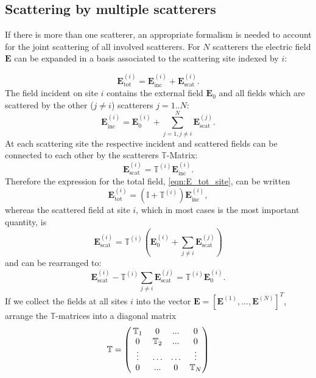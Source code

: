 \subsection{Scattering by multiple scatterers}
If there is more than one scatterer, an appropriate formalism is needed to account for the joint scattering of all involved scatterers. 
For $N$ scatterers the electric field $\mathbf{E}$ can be expanded in a basis associated to the scattering site indexed by $i$:

\begin{equation}
\mathbf{E}_\mathrm{tot}^{(i)} = \mathbf{E}_\mathrm{inc}^{(i)} + 
\mathbf{E}_\mathrm{scat}^{(i)}.
\label{eqn:E_tot_site}
\end{equation}
The field incident on site $i$ contains the external field $\mathbf{E}_0$ and all fields which are scattered by the other ($j\neq i$) scatterers $j=1..N$:
\begin{equation}
\mathbf{E}_\mathrm{inc}^{(i)} = \mathbf{E}_0^{(i)} + \sum_{j=1,j\neq i}^N\mathbf{E}_\mathrm{scat}^{(j)}.
\end{equation}
At each scattering site the respective incident and scattered fields can be connected to each other by the scatterers $\mathbb{T}$-Matrix:
\begin{equation}
\mathbf{E}_\mathrm{scat}^{(i)} = \mathbb{T}^{(i)} \mathbf{E}^{(i)}_\mathrm{inc}.
\end{equation}
Therefore the expression for the total field, \cref{eqn:E_tot_site}, can be written
\begin{equation}
\mathbf{E}_\mathrm{tot}^{(i)} = \left(\mathbb{I}+\mathbb{T}^{(i)}\right)\mathbf{E}^{(i)}_\mathrm{inc},
\end{equation}
whereas the scattered field at site $i$, which in most cases is the most important quantity, is
\begin{equation}
\mathbf{E}_\mathrm{scat}^{(i)} = \mathbb{T}^{(i)} \left(
\mathbf{E}_0^{(i)} + \sum_{j\neq i} \mathbf{E}^{(j)}_\mathrm{scat}
\right)
\end{equation}
and can be rearranged to:
\begin{equation}
\mathbf{E}_\mathrm{scat}^{(i)}-\mathbb{T}^{(i)}\sum_{j\neq i} \mathbf{E}^{(j)}_\mathrm{scat} = \mathbb{T}^{(i)}
\mathbf{E}_0^{(i)}.
\label{eqn:Escat_to_Einc}
\end{equation}
If we collect the fields at all sites $i$ into the vector $\mathbf{E}=\left[
\mathbf{E}^{(1)},...,\mathbf{E}^{(N)}
\right]^T$, arrange the $\mathbb{T}$-matrices into a diagonal matrix 
\begin{equation}
\mathbb{T} = 
\left(
\begin{matrix}
\mathbb{T}_1 & 0 & ... & 0 \\
0 & \mathbb{T}_2 & ... & 0 \\
\vdotswithin{\ldots} & \ldots &  \ldots & \vdotswithin{\ldots} \\
0 & ... & 0 & \mathbb{T}_N\\
\end{matrix}
\right)
\end{equation}
